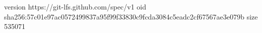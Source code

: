 version https://git-lfs.github.com/spec/v1
oid sha256:57c01e97ac0572499837a95f99f33830c9fcda3084c5eadc2cf67567ae3e079b
size 535071
